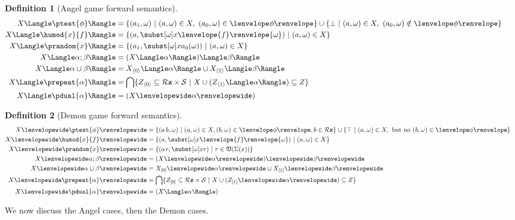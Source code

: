 \documentclass[12pt]{cmuthesis}
\theoremstyle{definition}
\newtheorem{definition}{Definition}
\theoremstyle{remark}
\newcommand{\allstate}{\mathcal{S}}
\newcommand{\om}{\omega}
\newcommand{\tint}[2]{\lenvelope{#1}\renvelope{#2}}
\begin{document}
\begin{definition}[Angel game forward semantics]
\begin{align*}
\strategyforR[\ptest{\phi}]{X}            &= \{(\rzSnd{\aa},\om)~|~ (\aa,\om) \in X,~(\rzFst{\aa},\om) \in \fintR{\phi}\}
                                                    \cup \{\sff~|~(\aa,\om) \in X,~(\rzFst{\aa},\om) \notin \fintR{\phi}\}\\ 
\strategyforR[\humod{x}{f}]{X}  &= \{(\aa,\ssub{\om}{x}{\tint{f}{\om}})~|~(\aa,\om) \in X\}&&\text{}\\ 
\strategyforR[\prandom{x}]{X}          &= \{(\rzSnd{\aa},\ssub{\om}{x}{\rzFst{\aa}(\om)})~|~(\aa,\om) \in X\}&&\text{}\\ 
\strategyforR[\alpha;\beta]{X}           &= \strategyforR[\beta]{(\strategyforR[\alpha]{X})} &&\text{}\\ 
\strategyforR[\alpha\cup\beta]{X}      &= \strategyforR[\alpha]{\apL{X}} \cup \strategyforR[\beta]{\apR{X}}&&\text{}\\
\strategyforR[\prepeat{\alpha}]{X}     &= \bigcap\{\apL{Z}\subseteq \allRz \times \allstate~|~ X \cup (\strategyforR[\alpha]{\apR{Z}}) \subseteq Z\}	
&&\\
\strategyforR[\pdual{\alpha}]{X}        &= (\dstrategyforR[\alpha]{X})&&\text{}
\end{align*}
\end{definition}
\begin{definition}[Demon game forward semantics]
\begin{align*}
\dstrategyforR[\ptest{\phi}]{X} &= \{(\rzApp{\aa}{\ab},\om)~|~(\aa,\om) \in X, (\ab,\om) \in \fintR{\phi}, \ab \in \allRz\}
                                                \cup \{\top~|~ (\aa,\om) \in X,\text{ but no } (\ab,\om) \in \fintR{\phi}\}&&\\
\dstrategyforR[\humod{x}{f}]{X} &= \{(\aa,\ssub{\om}{x}{\tint{f}{\om}})~|~(\aa,\om) \in X\} &&\text{}\\ 
\dstrategyforR[\prandom{x}]{X}     &= \{(\rzApp{\aa}{r},\ssub{\om}{x}{r})~|~r \in \valset{\Sigma(x)}\}&&\\ 
\dstrategyforR[\alpha;\beta]{X}       &= \dstrategyforR[\beta]{(\dstrategyforR[\alpha]{X})} &&\text{}\\ 
\dstrategyforR[\alpha\cup\beta]{X}  &= \dstrategyforR[\alpha]{\dpL{X}} \cup \dstrategyforR[\beta]{\dpR{X}} &&\text{}\\ 
\dstrategyforR[\prepeat{\alpha}]{X} &= \bigcap\{\dpL{Z}\subseteq \allRz \times \allstate~|~ X \cup (\dstrategyforR[\alpha]{\dpR{Z}}) \subseteq Z\}&&\\
\dstrategyforR[\pdual{\alpha}]{X}    &= (\strategyforR[\alpha]{X}) &&\text{}
\end{align*}
\end{definition}
We now discuss the Angel cases, then the Demon cases.
\end{document}
